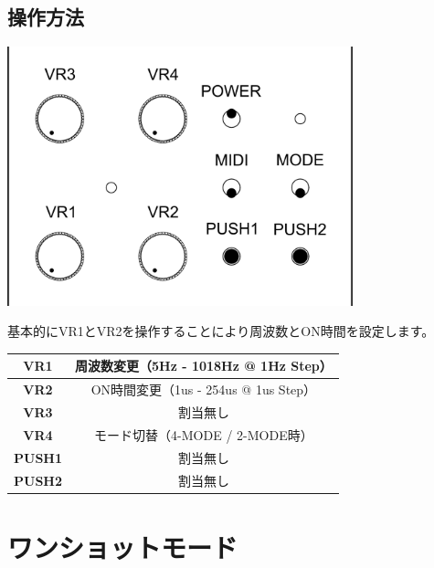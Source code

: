 \documentclass[a4paper,11pt]{jsarticle}
\begin{document}
\subsection{操作方法}

\vspace*{5mm}
\begin{center}
\includegraphics[width=100mm]{image/Arduino_Interrupter_v1_Design_Interrupter.png}
\end{center}
\vspace*{5mm}

基本的にVR1とVR2を操作することにより周波数とON時間を設定します。

\vspace*{5mm}

\begin{table}[htbp]
\begin{center}
\begin{tabular}{ | c | c | }
\hline
\textbf{VR1} & 周波数変更（5Hz - 1018Hz @ 1Hz Step） \\\hline
\textbf{VR2} & ON時間変更（1us - 254us @ 1us Step） \\\hline
\textbf{VR3} & 割当無し \\\hline
\textbf{VR4} & モード切替（4-MODE / 2-MODE時） \\\hline
\textbf{PUSH1} & 割当無し \\\hline
\textbf{PUSH2} & 割当無し \\\hline
\end{tabular}
\end{center}
\end{table}



\clearpage

\section{ワンショットモード}
\end{document}
